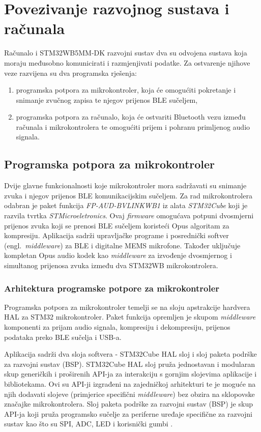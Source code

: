 \chapter{Povezivanje razvojnog sustava i računala}

Računalo i STM32WB5MM-DK razvojni sustav dva su odvojena sustava koja moraju međusobno komunicirati i razmjenjivati podatke. Za ostvarenje njihove veze razvijena su dva programska rješenja:
\begin{enumerate}
	\item programska potpora za mikrokontroler, koja će omogućiti pokretanje i snimanje zvučnog zapisa te njegov prijenos BLE sučeljem,
	\item programska potpora za računalo, koja će ostvariti Bluetooth vezu između računala i mikrokontrolera te omogućiti prijem i pohranu primljenog audio signala.
\end{enumerate} 

\section{Programska potpora za mikrokontroler}

Dvije glavne funkcionalnosti koje mikrokontroler mora sadržavati su snimanje zvuka i njegov prijenos BLE komunikacijskim sučeljem. Za rad mikrokontrolera odabran je paket funkcija \textit{FP-AUD-BVLINKWB1} iz alata \textit{STM32Cube} koji je razvila tvrtka \textit{STMicroeletronics}. Ovaj \textit{firmware} omogućava potpuni dvosmjerni prijenos zvuka koji se prenosi BLE sučeljem koristeći Opus algoritam za kompresiju. Aplikacija sadrži upravljačke programe i posrednički softver (engl.~\textit{middleware}) za BLE i digitalne MEMS mikrofone. Također uključuje kompletan Opus audio kodek kao \textit{middleware} za izvođenje dvosmjernog i simultanog prijenosa zvuka između dva STM32WB mikrokontrolera. 

\subsection{Arhitektura programske potpore za mikrokontroler}

Programska potpora za mikrokontroler temelji se na sloju apstrakcije hardvera HAL za STM32 mikrokontroler. Paket funkcija opremljen je skupom \textit{middleware} komponenti za prijam audio signala, kompresiju i
dekompresiju, prijenos podataka preko BLE sučelja i USB-a.

Aplikacija sadrži dva sloja softvera - STM32Cube HAL sloj i sloj paketa podrške za razvojni sustav (BSP). STM32Cube HAL sloj pruža jednostavan i modularan skup generičkih i proširenih API-ja za interakciju s gornjim slojevima aplikacije i bibliotekama. Ovi su API-ji izgrađeni na zajedničkoj arhitekturi te je moguće na njih dodavati slojeve (primjerice specifični \textit{middleware}) bez obzira na sklopovske značajke mikrokontrolera.
Sloj paketa podrške za razvojni sustav (BSP) je skup API-ja koji pruža programsko sučelje za periferne uređaje specifične za razvojni sustav kao što su SPI, ADC, LED i korisnički gumbi \cite{fpaudbvlink}. 

